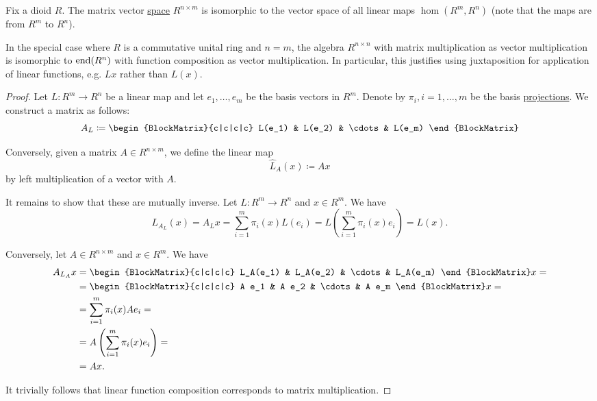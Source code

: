 \begin{proposition}\label{thm:finite_dimensional_operators_are_isomorphic_to_matrices}
  Fix a dioid \( R \). The matrix vector \hyperref[def:algebra_of_matrices]{space} \( R^{n \times m} \) is isomorphic to the vector space of all linear maps \( \hom(R^m, R^n) \) (note that the maps are from \( R^m \) to \( R^n \)).

  In the special case where \( R \) is a commutative unital ring and \( n = m \), the algebra \( R^{n \times n} \) with matrix multiplication as vector multiplication is isomorphic to \( \operatorname{end}(R^n) \) with function composition as vector multiplication. In particular, this justifies using juxtaposition for application of linear functions, e.g. \( Lx \) rather than \( L(x) \).
\end{proposition}
\begin{proof}
  Let \( L: R^m \to R^n \) be a linear map and let \( e_1, \ldots, e_m \) be the basis vectors in \( R^m \). Denote by \( \pi_i, i = 1, \ldots, m \) be the basis \hyperref[def:left_module_basis_projection]{projections}. We construct a matrix as follows:
  \begin{equation*}
    A_L \coloneqq \begin{BlockMatrix}{c|c|c|c}
      L(e_1) & L(e_2) & \cdots & L(e_m)
    \end{BlockMatrix}
  \end{equation*}

  Conversely, given a matrix \( A \in R^{n \times m} \), we define the linear map
  \begin{equation*}
    \hat L_A(x) \coloneqq Ax
  \end{equation*}
  by left multiplication of a vector with \( A \).

  It remains to show that these are mutually inverse. Let \( L: R^m \to R^n \) and \( x \in R^m \). We have
  \begin{equation*}
    L_{A_L}(x) = A_L x = \sum_{i=1}^m \pi_i(x) L(e_i) = L\left(\sum_{i=1}^m \pi_i(x) e_i \right) = L(x).
  \end{equation*}

  Conversely, let \( A \in R^{n \times m} \) and \( x \in R^m \). We have
  \begin{align*}
    A_{L_A} x
    &=
    \begin{BlockMatrix}{c|c|c|c}
      L_A(e_1) & L_A(e_2) & \cdots & L_A(e_m)
    \end{BlockMatrix}
    x
    = \\ &=
    \begin{BlockMatrix}{c|c|c|c}
      A e_1 & A e_2 & \cdots & A e_m
    \end{BlockMatrix}
    x
    = \\ &=
    \sum_{i=1}^m \pi_i(x) A e_i
    = \\ &=
    A \left( \sum_{i=1}^m \pi_i(x) e_i \right)
    = \\ &=
    Ax.
  \end{align*}

  It trivially follows that linear function composition corresponds to matrix multiplication.
\end{proof}

